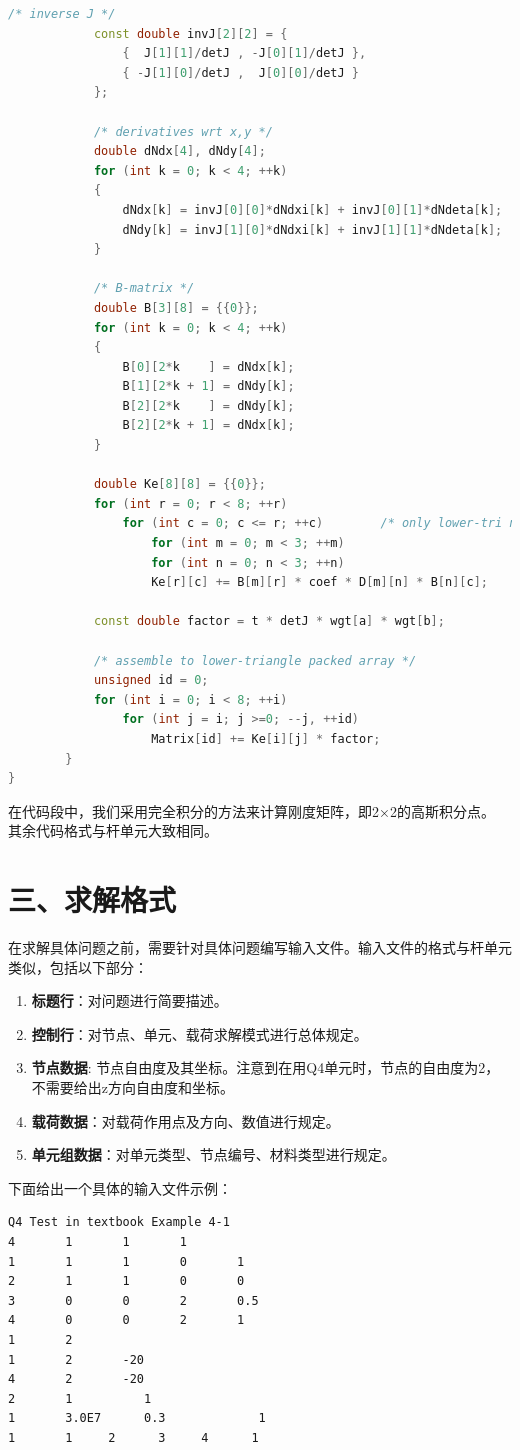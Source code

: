 \documentclass[12pt]{article}
\begin{document}
\begin{enumerate}
\begin{lstlisting}[language=C++]
            /* inverse J */
            const double invJ[2][2] = {
                {  J[1][1]/detJ , -J[0][1]/detJ },
                { -J[1][0]/detJ ,  J[0][0]/detJ }
            };

            /* derivatives wrt x,y */
            double dNdx[4], dNdy[4];
            for (int k = 0; k < 4; ++k)
            {
                dNdx[k] = invJ[0][0]*dNdxi[k] + invJ[0][1]*dNdeta[k];
                dNdy[k] = invJ[1][0]*dNdxi[k] + invJ[1][1]*dNdeta[k];
            }

            /* B-matrix */
            double B[3][8] = {{0}};
            for (int k = 0; k < 4; ++k)
            {
                B[0][2*k    ] = dNdx[k];
                B[1][2*k + 1] = dNdy[k];
                B[2][2*k    ] = dNdy[k];
                B[2][2*k + 1] = dNdx[k];
            }

            double Ke[8][8] = {{0}};
            for (int r = 0; r < 8; ++r)
                for (int c = 0; c <= r; ++c)        /* only lower-tri needed */
                    for (int m = 0; m < 3; ++m)
                    for (int n = 0; n < 3; ++n)
                    Ke[r][c] += B[m][r] * coef * D[m][n] * B[n][c];

            const double factor = t * detJ * wgt[a] * wgt[b];

            /* assemble to lower-triangle packed array */
            unsigned id = 0;
            for (int i = 0; i < 8; ++i)
                for (int j = i; j >=0; --j, ++id)
                    Matrix[id] += Ke[i][j] * factor;
        }
}
\end{lstlisting}
在代码段中，我们采用完全积分的方法来计算刚度矩阵，即2×2的高斯积分点。\\
其余代码格式与杆单元大致相同。
\end{enumerate}
\section*{三、求解格式}
在求解具体问题之前，需要针对具体问题编写输入文件。输入文件的格式与杆单元类似，包括以下部分：
\begin{enumerate}
    \item \textbf{标题行}：对问题进行简要描述。
    \item \textbf{控制行}：对节点、单元、载荷求解模式进行总体规定。
    \item \textbf{节点数据}: 节点自由度及其坐标。注意到在用Q4单元时，节点的自由度为2，不需要给出z方向自由度和坐标。
    \item \textbf{载荷数据}：对载荷作用点及方向、数值进行规定。
    \item \textbf{单元组数据}：对单元类型、节点编号、材料类型进行规定。
\end{enumerate}
下面给出一个具体的输入文件示例：
\begin{lstlisting}[basicstyle=\ttfamily\small]
Q4 Test in textbook Example 4-1
4		1		1		1              
1		1		1		0		1		
2		1		1		0		0		
3		0		0		2		0.5		
4		0		0		2		1		
1		2
1		2		-20
4       2       -20
2		1		   1              
1		3.0E7	   0.3             1
1		1	  2      3     4	  1
\end{lstlisting}
\end{document}
